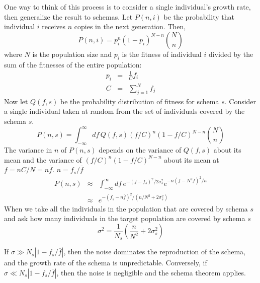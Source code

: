 One way to think of this process is to consider a single individual's
growth rate, then generalize the result to schemas.  Let $P(n,i)$ be
the probability that individual $i$ receives $n$ copies in the next
generation.  Then,
\begin{equation}
P(n,i)=p_i^n (1-p_i)^{N-n} {N \choose n}
\end{equation}
where $N$ is the population size and $p_i$ is the fitness of individual $i$
divided by the sum of the fitnesses of the entire population:
\begin{eqnarray}
p_i&=& \frac{1}{C} f_i \nonumber\\
C&=& \sum_{j=1}^N{f_j}
\end{eqnarray}
Now let $Q(f,s)$ be the probability distribution of fitness for schema $s$.
Consider a single individual taken at random from the set of individuals
covered by the schema $s$.
\begin{equation}
P(n,s)= \int_{-\infty}^{\infty}{
        df\, Q(f,s) (f/C)^n (1-f/C)^{N-n} {N \choose n}
}
\end{equation}
The variance in $n$ of $P(n,s)$ depends on the variance of $Q(f,s)$ about
its mean and the variance of $(f/C)^n (1-f/C)^{N-n}$ about its mean
at $f=n C/N= n \overline{f}$.
$n=f_s/\overline{f}$
\begin{eqnarray}
P(n,s) &\approx& \int_{-\infty}^{\infty}{
           df\, e^{-(f-f_s)^2/2\sigma_s^2} e^{-n(f-N^2\overline{f})^2/n}}
        \nonumber\\
        &\approx& e^{-(f_s-n \overline{f})^2/(n/N^2 +2 \sigma_s^2)}
\end{eqnarray}
When we take all the individuals in the population that are covered by
schema $s$ and ask how many individuals in the target population are covered
by schema $s$
\begin{equation}
\sigma^2=\frac{1}{N_s}(\frac{n}{N^2}+2 \sigma_s^2)
\end{equation}

If $\sigma \gg N_s |1 - f_s/\overline{f}|$, then the noise dominates the
reproduction of the schema, and the growth rate of the schema is unpredictable.
Conversely, if $\sigma \ll N_s |1 - f_s /\overline{f}|$, then the noise is
negligible and the schema theorem applies.

